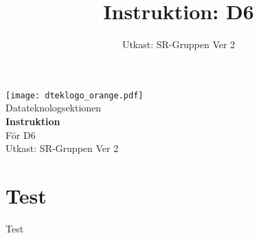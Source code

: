 \documentclass[a4paper]{dtek}
\title{Instruktion: D6}
\date{Utkast: SR-Gruppen Ver 2}
\begin{document}
\begin{titlepage}
  \vspace*{1cm} %
  \thispagestyle{empty} %
  \begin{center}
      \texttt{[image: dteklogo\_orange.pdf]}\\[3em]
      {\Huge Datateknologsektionen}\\[3em]
      {\Huge \textbf{Instruktion}}\\[1em]
      {\Huge För D6}\\[3em]
      Utkast: SR-Gruppen Ver 2\\
  \end{center}
\end{titlepage}
\makeheadfoot

\section{Test}
Test
\end{document}
